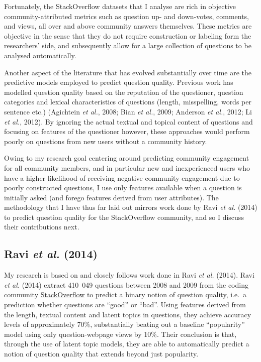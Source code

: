 \documentclass[11pt,preprint, authoryear]{article}
\numberwithin{equation}{section}
\begin{document}
Fortunately, the StackOverflow datasets that I analyse are rich in
objective community-attributed metrics such as question up- and
down-votes, comments, and views, all over and above community answers
themselves. These metrics are objective in the sense that they do not
require construction or labeling form the researchers' side, and
subsequently allow for a large collection of questions to be analysed
automatically.

Another aspect of the literature that has evolved substantially over
time are the predictive models employed to predict question quality.
Previous work has modelled question quality based on the reputation of
the questioner, question categories and lexical characteristics of
questions (length, misspelling, words per sentence etc.) (Agichtein
\emph{et al.}, 2008; Bian \emph{et al.}, 2009; Anderson \emph{et al.},
2012; Li \emph{et al.}, 2012). By ignoring the actual textual and
topical content of questions and focusing on features of the questioner
however, these approaches would perform poorly on questions from new
users without a community history.

Owing to my research goal centering around predicting community
engagement for all community members, and in particular new and
inexperienced users who have a higher likelihood of receiving negative
community engagement due to poorly constructed questions, I use only
features available when a question is initially asked (and forego
features derived from user attributes). The methodology that I have thus
far laid out mirrors work done by Ravi \emph{et al.} (2014) to predict
question quality for the StackOverflow community, and so I discuss their
contributions next.

\subsection{\texorpdfstring{Ravi \emph{et al.}
(2014)}{Ravi et al. (2014)}}\label{ravi2014}

My research is based on and closely follows work done in Ravi \emph{et
al.} (2014). Ravi \emph{et al.} (2014) extract 410~049 questions between
2008 and 2009 from the coding community
\href{https://stackoverflow.com}{StackOverflow} to predict a binary
notion of question quality, i.e.~a prediction whether questions are
``good'' or ``bad''. Using features derived from the length, textual
content and latent topics in questions, they achieve accuracy levels of
approximately 70\%, substantially beating out a baseline ``popularity''
model using only question-webpage views by 10\%. Their conclusion is
that, through the use of latent topic models, they are able to
automatically predict a notion of question quality that extends beyond
just popularity.
\end{document}
